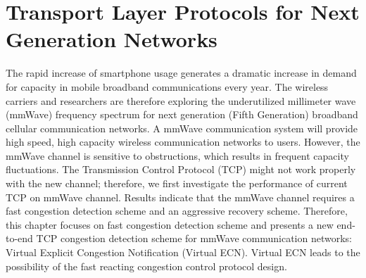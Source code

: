 \chapter{Transport Layer Protocols for Next Generation Networks}\label{ch:5} 


\par The rapid increase of smartphone usage generates a dramatic increase in demand for capacity in mobile broadband communications every year. The wireless carriers and researchers are therefore exploring the underutilized millimeter wave (mmWave) frequency spectrum for next generation (Fifth Generation) broadband cellular communication networks. A mmWave communication system will provide high speed, high capacity wireless communication networks to users. However, the mmWave channel is sensitive to obstructions, which results in frequent capacity fluctuations. The Transmission Control Protocol (TCP) might not work properly with the new channel; therefore, we first investigate the performance of current TCP on mmWave channel. Results indicate that the mmWave channel requires a fast congestion detection scheme and an aggressive recovery scheme. Therefore, this chapter focuses on fast congestion detection scheme and presents a new end-to-end TCP congestion detection scheme for mmWave communication networks: Virtual Explicit Congestion Notification (Virtual ECN). Virtual ECN leads to the possibility of the fast reacting congestion control protocol design.
